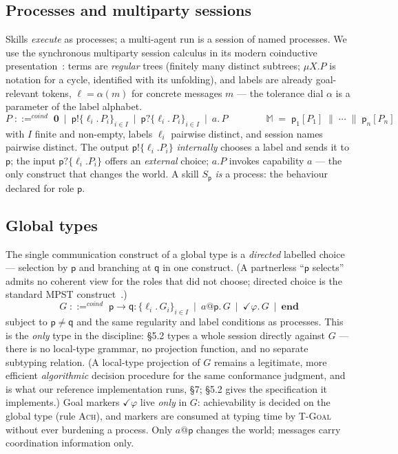\documentclass[11pt]{article}
\theoremstyle{plain}
\theoremstyle{definition}
\newcommand{\coind}{\mathrel{::=^{\mathit{coind}}}}
\newcommand{\MM}{\mathbb{M}}
\newcommand{\ppar}{\;\|\;}
\begin{document}
\subsection{Processes and multiparty sessions}
\label{sec:processes}
Skills \emph{execute} as processes; a multi-agent run is a session of named
processes. We use the synchronous multiparty session calculus in its modern
coinductive presentation~\cite{yoshidagheri,ghilezan}: terms are \emph{regular}
trees (finitely many distinct subtrees; $\mu X.P$ is notation for a cycle,
identified with its unfolding), and labels are already goal-relevant tokens,
$\ell=\alpha(m)$ for concrete messages $m$ --- the tolerance dial $\alpha$ is a
parameter of the label alphabet.
\[
P \;\coind\; \mathbf{0}
  \ \mid\ \mathsf{p}!\{\ell_i.\,P_i\}_{i\in I}
  \ \mid\ \mathsf{p}?\{\ell_i.\,P_i\}_{i\in I}
  \ \mid\ a.\,P
\qquad\qquad
\MM \;=\; \mathsf{p}_1[P_1] \ppar \cdots \ppar \mathsf{p}_n[P_n]
\]
with $I$ finite and non-empty, labels $\ell_i$ pairwise distinct, and session
names pairwise distinct. The output $\mathsf{p}!\{\ell_i.P_i\}$
\emph{internally} chooses a label and sends it to $\mathsf p$; the input
$\mathsf{p}?\{\ell_i.P_i\}$ offers an \emph{external} choice; $a.P$ invokes
capability $a$ --- the only construct that changes the world. A skill
$S_{\mathsf p}$ \emph{is} a process: the behaviour declared for role
$\mathsf p$.

\subsection{Global types}
\label{sec:types-syntax}
The single communication construct of a global type is a \emph{directed}
labelled choice --- selection by $\mathsf p$ and branching at $\mathsf q$ in one
construct. (A partnerless ``$\mathsf p$ selects'' admits no coherent view for the
roles that did not choose; directed choice is the standard MPST
construct~\cite{honda,yoshidagheri}.)
\[
G \;\coind\; \mathsf{p}{\to}\mathsf{q}:\{\ell_i.\,G_i\}_{i\in I}
  \ \mid\ a@\mathsf{p}.\,G
  \ \mid\ \checkmark\varphi.\,G
  \ \mid\ \mathbf{end}
\]
subject to $\mathsf p\neq\mathsf q$ and the same regularity and label
conditions as processes. This is the \emph{only} type in the discipline: \S5.2
types a whole session directly against $G$ --- there is no local-type grammar,
no projection function, and no separate subtyping relation. (A local-type
projection of $G$ remains a legitimate, more efficient \emph{algorithmic}
decision procedure for the same conformance judgment, and is what our reference
implementation runs, \S7; \S5.2 gives the specification it implements.) Goal
markers $\checkmark\varphi$ live \emph{only} in $G$: achievability is decided on
the global type (rule \textsc{Ach}), and markers are consumed at typing time by
\textsc{T-Goal} without ever burdening a process. Only $a@\mathsf p$ changes the
world; messages carry coordination information only.
\end{document}
